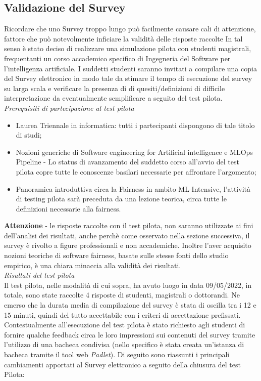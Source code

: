   



    \subsection{Validazione del Survey}
    
    Ricordare che uno Survey troppo lungo può facilmente causare cali di attenzione, fattore che può notevolmente inficiare la validità delle risposte raccolte\cite{andrews2007conducting}
    In tal senso è stato deciso di realizzare una simulazione pilota con studenti magistrali, frequentanti un corso accademico specifico di Ingegneria del Software per l'intelligenza artificiale. I suddetti studenti saranno invitati a compilare una copia del Survey elettronico in modo tale da stimare il tempo di esecuzione del survey su larga scala e verificare la presenza di di quesiti/definizioni di difficile interpretazione da eventualmente semplificare a seguito del test pilota.\\
    
    \emph{Prerequisiti di partecipazione al test pilota}
    \begin{itemize}
        \item Laurea Triennale in informatica: tutti i partecipanti dispongono di tale titolo di studi;
        \item Nozioni generiche di Software engineering for Artificial intelligence e MLOps Pipeline - Lo status di avanzamento del suddetto corso all'avvio del test pilota copre tutte le conoscenze basilari necessarie per affrontare l'argomento;
        \item Panoramica introduttiva circa la Fairness in ambito ML-Intensive, l'attività di testing pilota sarà preceduta da una lezione teorica, circa tutte le definizioni necessarie alla fairness.
    \end{itemize}
    
   \textbf{ Attenzione } - le risposte raccolte con il test pilota, non saranno utilizzate ai fini dell'analisi dei risultati, anche perchè come osservato nella sezione successiva, il survey è rivolto a figure professionali e non accademiche. Inoltre l'aver acquisito nozioni teoriche di software fairness, basate sulle stesse fonti dello studio empirico, è una chiara minaccia alla validità dei risultati.\\
   
   \emph{Risultati del test pilota}\\
   Il test pilota, nelle modalità di cui sopra, ha avuto luogo in data 09/05/2022, in totale, sono state raccolte 4 risposte di studenti, magistrali o dottorandi. Ne emerso che la durata media di compilazione del survey è stata di oscilla tra i 12 e 15 minuti, quindi del tutto accettabile con i criteri di accettazione prefissati. Contestualmente all'esecuzione del test pilota è stato richiesto agli studenti di fornire qualche feedback circa le loro impressioni sui contenuti del survey tramite l'utilizzo di una bacheca condivisa (nello specifico è stata creata un'istanza di bacheca tramite il tool web \emph{Padlet}). Di seguito sono riassunti i principali cambiamenti apportati al Survey elettronico a seguito della chiusura del test Pilota:\\
   
